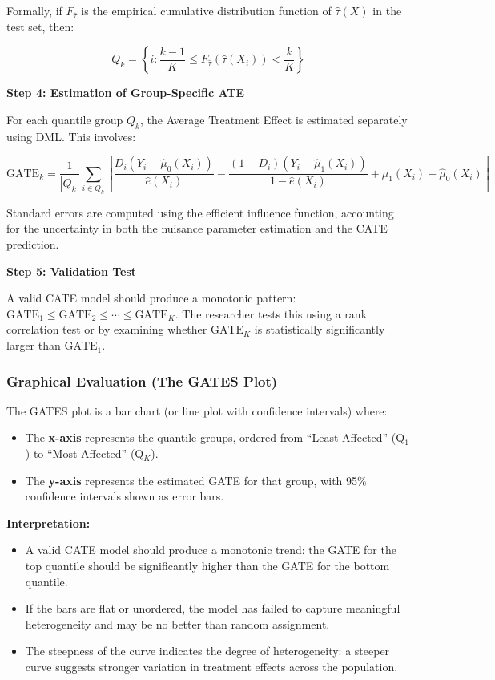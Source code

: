 \documentclass[12pt,a4paper]{article}
\begin{document}
Formally, if $F_{\hat{\tau}}$ is the empirical cumulative distribution function of $\hat{\tau}(X)$ in the test set, then:

\begin{equation}
Q_k = \left\{ i : \frac{k-1}{K} \leq F_{\hat{\tau}}(\hat{\tau}(X_i)) < \frac{k}{K} \right\}
\end{equation}

\textbf{Step 4: Estimation of Group-Specific ATE}

For each quantile group $Q_k$, the Average Treatment Effect is estimated separately using DML. This involves:

\begin{equation}
\text{GATE}_k = \frac{1}{|Q_k|} \sum_{i \in Q_k} \left[ \frac{D_i(Y_i - \hat{\mu}_0(X_i))}{\hat{e}(X_i)} - \frac{(1-D_i)(Y_i - \hat{\mu}_1(X_i))}{1-\hat{e}(X_i)} + \hat{\mu}_1(X_i) - \hat{\mu}_0(X_i) \right]
\end{equation}

Standard errors are computed using the efficient influence function, accounting for the uncertainty in both the nuisance parameter estimation and the CATE prediction.

\textbf{Step 5: Validation Test}

A valid CATE model should produce a monotonic pattern: $\text{GATE}_1 \leq \text{GATE}_2 \leq \cdots \leq \text{GATE}_K$. The researcher tests this using a rank correlation test or by examining whether $\text{GATE}_K$ is statistically significantly larger than $\text{GATE}_1$.

\subsubsection{Graphical Evaluation (The GATES Plot)}

The GATES plot is a bar chart (or line plot with confidence intervals) where:
\begin{itemize}
\item The \textbf{x-axis} represents the quantile groups, ordered from ``Least Affected'' (Q$_1$) to ``Most Affected'' (Q$_K$).
\item The \textbf{y-axis} represents the estimated GATE for that group, with 95\% confidence intervals shown as error bars.
\end{itemize}

\textbf{Interpretation:}
\begin{itemize}
\item A valid CATE model should produce a monotonic trend: the GATE for the top quantile should be significantly higher than the GATE for the bottom quantile.
\item If the bars are flat or unordered, the model has failed to capture meaningful heterogeneity and may be no better than random assignment.
\item The steepness of the curve indicates the degree of heterogeneity: a steeper curve suggests stronger variation in treatment effects across the population.
\end{itemize}
\end{document}
